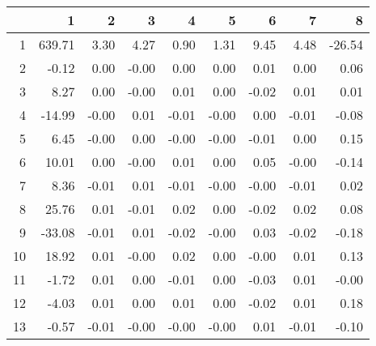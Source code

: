 \begin{table}[ht]
\centering
\begin{tabular}{rrrrrrrrr}
  \hline
 & 1 & 2 & 3 & 4 & 5 & 6 & 7 & 8 \\ 
  \hline
1 & 639.71 & 3.30 & 4.27 & 0.90 & 1.31 & 9.45 & 4.48 & -26.54 \\ 
  2 & -0.12 & 0.00 & -0.00 & 0.00 & 0.00 & 0.01 & 0.00 & 0.06 \\ 
  3 & 8.27 & 0.00 & -0.00 & 0.01 & 0.00 & -0.02 & 0.01 & 0.01 \\ 
  4 & -14.99 & -0.00 & 0.01 & -0.01 & -0.00 & 0.00 & -0.01 & -0.08 \\ 
  5 & 6.45 & -0.00 & 0.00 & -0.00 & -0.00 & -0.01 & 0.00 & 0.15 \\ 
  6 & 10.01 & 0.00 & -0.00 & 0.01 & 0.00 & 0.05 & -0.00 & -0.14 \\ 
  7 & 8.36 & -0.01 & 0.01 & -0.01 & -0.00 & -0.00 & -0.01 & 0.02 \\ 
  8 & 25.76 & 0.01 & -0.01 & 0.02 & 0.00 & -0.02 & 0.02 & 0.08 \\ 
  9 & -33.08 & -0.01 & 0.01 & -0.02 & -0.00 & 0.03 & -0.02 & -0.18 \\ 
  10 & 18.92 & 0.01 & -0.00 & 0.02 & 0.00 & -0.00 & 0.01 & 0.13 \\ 
  11 & -1.72 & 0.01 & 0.00 & -0.01 & 0.00 & -0.03 & 0.01 & -0.00 \\ 
  12 & -4.03 & 0.01 & 0.00 & 0.01 & 0.00 & -0.02 & 0.01 & 0.18 \\ 
  13 & -0.57 & -0.01 & -0.00 & -0.00 & -0.00 & 0.01 & -0.01 & -0.10 \\ 
   \hline
\end{tabular}
\end{table}
